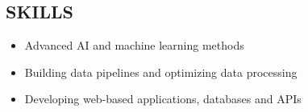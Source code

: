 \documentclass[]{res}
\begin{document}
\address{
(905) 758-2239 \textbar ~paul.ashbourne@gmail.com \\
\url{www.paulashbourne.com} \\
\url{www.github.com/paulashbourne} %
}
\address{110 Orchard Heights Blvd.\\ \hfill Aurora, ON, Canada\\ \hfill L4G 2Z9}
\begin{resume}
 
\section{SKILLS}
\begin{itemize}
  \item Advanced AI and machine learning methods
  \item Building data pipelines and optimizing data processing
  \item Developing web-based applications, databases and APIs
\end{itemize}


\end{resume}
\end{document}

